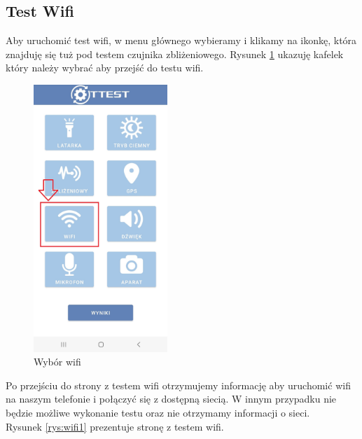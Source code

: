 \newpage


\subsection{Test Wifi}

\hspace{0.60cm}Aby uruchomić test wifi, w menu głównego wybieramy i klikamy na ikonkę, która znajduję się tuż pod testem czujnika zbliżeniowego. Rysunek \ref{rys:wifi} ukazuję kafelek który należy wybrać aby przejść do testu wifi. 

\begin{figure}[!hbt]
	\begin{center}
		\includegraphics[angle=360, width=0.45\textwidth]{rys/punkt6/wifi}
		\caption{Wybór wifi}
		\label{rys:wifi}
	\end{center}
\end{figure}

\newpage 


Po przejściu do strony z testem wifi otrzymujemy informację aby uruchomić wifi na naszym telefonie i połączyć się z dostępną siecią. W innym przypadku nie będzie możliwe wykonanie testu oraz nie otrzymamy informacji o sieci. \\
Rysunek \ref{rys:wifi1} prezentuje stronę z testem wifi.

